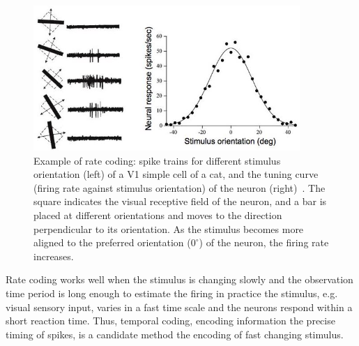 \begin{figure}[bt]
	\centering
	\includegraphics[width=0.9\textwidth]{pics_snn/v1.jpg}
	\caption{Example of rate coding: spike trains for different stimulus orientation (left) of a V1 simple cell of a cat, and the tuning curve (firing rate against stimulus orientation) of the neuron (right)~\citep{hubel1962receptive}.
	The square indicates the visual receptive field of the neuron, and a bar is placed at different orientations and moves to the direction perpendicular to its orientation.
    As the stimulus becomes more aligned to the preferred orientation ($0^\circ$) of the neuron, the firing rate increases.}
	\label{Fig:v1}
\end{figure}

Rate coding works well when the stimulus is changing slowly and the observation time period is long enough to estimate the firing \protect{} \protect{} in practice the stimulus, e.g. visual sensory input, varies in a fast time scale and the neurons respond within a short reaction time.
Thus, temporal coding, encoding information \protect{} \protect{} the precise timing of spikes, is a candidate method \protect{} \protect{} the encoding of \protect{} fast changing stimulus.

